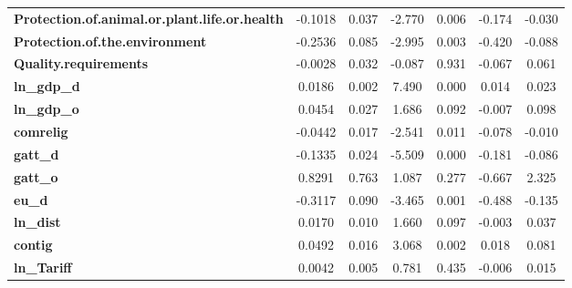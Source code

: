 \begin{center}
\begin{tabular}{lcccccc}
\textbf{Protection.of.animal.or.plant.life.or.health}              &      -0.1018  &        0.037     &    -2.770  &         0.006        &       -0.174    &       -0.030     \\
\textbf{Protection.of.the.environment}                             &      -0.2536  &        0.085     &    -2.995  &         0.003        &       -0.420    &       -0.088     \\
\textbf{Quality.requirements}                                      &      -0.0028  &        0.032     &    -0.087  &         0.931        &       -0.067    &        0.061     \\
\textbf{ln\_gdp\_d}                                                &       0.0186  &        0.002     &     7.490  &         0.000        &        0.014    &        0.023     \\
\textbf{ln\_gdp\_o}                                                &       0.0454  &        0.027     &     1.686  &         0.092        &       -0.007    &        0.098     \\
\textbf{comrelig}                                                  &      -0.0442  &        0.017     &    -2.541  &         0.011        &       -0.078    &       -0.010     \\
\textbf{gatt\_d}                                                   &      -0.1335  &        0.024     &    -5.509  &         0.000        &       -0.181    &       -0.086     \\
\textbf{gatt\_o}                                                   &       0.8291  &        0.763     &     1.087  &         0.277        &       -0.667    &        2.325     \\
\textbf{eu\_d}                                                     &      -0.3117  &        0.090     &    -3.465  &         0.001        &       -0.488    &       -0.135     \\
\textbf{ln\_dist}                                                  &       0.0170  &        0.010     &     1.660  &         0.097        &       -0.003    &        0.037     \\
\textbf{contig}                                                    &       0.0492  &        0.016     &     3.068  &         0.002        &        0.018    &        0.081     \\
\textbf{ln\_Tariff}                                                &       0.0042  &        0.005     &     0.781  &         0.435        &       -0.006    &        0.015     \\
\bottomrule
\end{tabular}
\end{center}